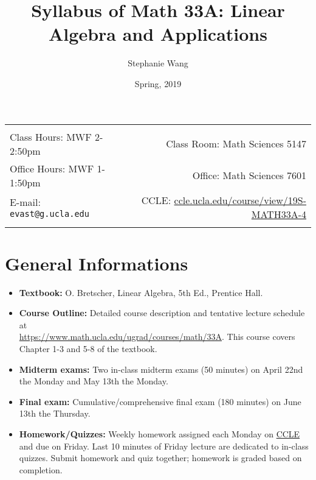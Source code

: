 \documentclass[11pt]{article}
\title{Syllabus of Math 33A: Linear Algebra and Applications}
\author{Stephanie Wang}
\date{Spring, 2019}
\begin{document}
\maketitle

\begin{tabular*}{.93\textwidth}{@{\extracolsep{\fill}}lr}


\hline
 & \\
 Class Hours: MWF 2-2:50pm & Class Room: Math Sciences 5147 \\
 Office Hours: MWF 1-1:50pm  &  Office: Math Sciences 7601 \\
 E-mail: \texttt{evast@g.ucla.edu} & CCLE: \href{https://ccle.ucla.edu/course/view/19S-MATH33A-4}{ccle.ucla.edu/course/view/19S-MATH33A-4}\\ 
 & \\
\hline
\end{tabular*}

\vspace{5 mm}


\section*{General Informations}
\begin{itemize}
  \item {\bf Textbook:} O. Bretscher, Linear Algebra, 5th Ed., Prentice Hall.
  \item {\bf Course Outline:} Detailed course description and tentative lecture schedule at \\ \href{https://www.math.ucla.edu/ugrad/courses/math/33A}{https://www.math.ucla.edu/ugrad/courses/math/33A}. This course covers Chapter 1-3 and 5-8 of the textbook.
  \item {\bf Midterm exams:} Two in-class midterm exams (50 minutes) on April 22nd the Monday and May 13th the Monday.
  \item {\bf Final exam:} Cumulative/comprehensive final exam (180 minutes) on June 13th the Thursday.
  \item {\bf Homework/Quizzes:} Weekly homework assigned each Monday on \href{https://ccle.ucla.edu/course/view/19S-MATH33A-4}{CCLE} and due on Friday. Last 10 minutes of Friday lecture are dedicated to in-class quizzes. Submit homework and quiz together; homework is graded based on completion. 
  \
\end{itemize}
\end{document}
